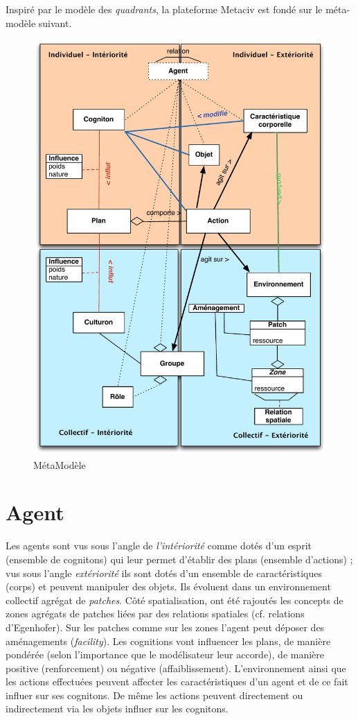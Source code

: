 \documentclass[a4paper,oneside,12 pt]{article}
\begin{document}
Inspiré par le modèle des \textit{quadrants}, la plateforme Metaciv est fondé sur le  méta-modèle suivant.
\begin{figure}[!h]
\begin{center}
\includegraphics[scale=0.6]{modele.pdf}
\caption[Modele]{MétaModèle \\}
\label{ex1}
\end{center}
\end{figure} 
\section{Agent}
Les agents sont vus sous l'angle de \textit{l'intériorité }comme dotés d'un esprit (ensemble de cognitons) qui leur permet d'établir des plans (ensemble d'actions) ;  vus sous l'angle \textit{extériorité} ils sont dotés d'un ensemble de caractéristiques (corps) et peuvent manipuler des objets. Ils évoluent dans un environnement collectif agrégat de \textit{patches}. Côté spatialisation, ont été rajoutés les concepts de zones agrégats de patches liées par des relations spatiales (cf. relations d'Egenhofer). Sur les patches comme sur les zones l'agent peut déposer des aménagements (\textit{facility}).
Les cognitions vont influencer les plans, de manière pondérée (selon l'importance que le modélisateur leur accorde), de manière positive (renforcement) ou négative (affaiblissement).
L'environnement ainsi que les actions effectuées peuvent affecter les caractéristiques d'un agent et de ce fait influer sur ses cognitons.
De même les actions peuvent directement ou indirectement via les objets influer sur les cognitons.
\end{document}
